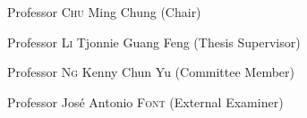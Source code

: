 
\begin{committee}
\vspace{0.9cm}
    \Large
	\textrm{Professor \textsc{Chu} Ming Chung (Chair)}

\vspace{0.4cm}

    \textrm{Professor \textsc{Li} Tjonnie Guang Feng (Thesis Supervisor)}

\vspace{0.4cm}

	\textrm{Professor \textsc{Ng} Kenny Chun Yu (Committee Member)}

\vspace{0.4cm}

    \textrm{Professor José Antonio \textsc{Font} (External Examiner)}

\end{committee}
